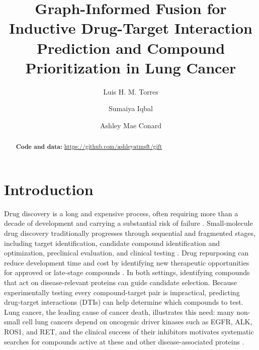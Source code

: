 \documentclass[10pt,letterpaper]{article}
\newcommand{\repourl}{\url{https://github.com/ashleyatmsft/gift}}
\begin{document}
\thispagestyle{empty}

\title{Graph-Informed Fusion for Inductive Drug-Target Interaction Prediction and Compound Prioritization in Lung Cancer}

\author[1,2]{Luis H. M. Torres}
\author[3]{Sumaiya Iqbal}
\author[1]{Ashley Mae Conard}


\date{}

\maketitle
\thispagestyle{empty}

\begin{abstract}
  

  \medskip
  \noindent\textbf{Code and data:} \repourl
\end{abstract}

\clearpage
\setcounter{page}{1}

\section{Introduction}
\label{sec:intro}
Drug discovery is a long and expensive process, often requiring more than a decade of development and carrying a substantial risk of failure \cite{hughes2011principles, paul2010improve}. 
Small-molecule drug discovery traditionally progresses through sequential and fragmented stages, including target identification, candidate compound identification and optimization, preclinical evaluation, and clinical testing \cite{hughes2011principles}. Drug repurposing can reduce development time and cost by identifying new therapeutic opportunities for approved or late-stage compounds \cite{pushpakom2019drug}. 
In both settings, identifying compounds that act on disease-relevant proteins can guide candidate selection. 
Because experimentally testing every compound-target pair is impractical, predicting drug-target interactions (DTIs) can help determine which compounds to test.
Lung cancer, the leading cause of cancer death, illustrates this need: many non-small cell lung cancers depend on oncogenic driver kinases such as EGFR, ALK, ROS1, and RET, and the clinical success of their inhibitors motivates systematic searches for compounds active at these and other disease-associated proteins \cite{herbst2018biology}.
\end{document}
